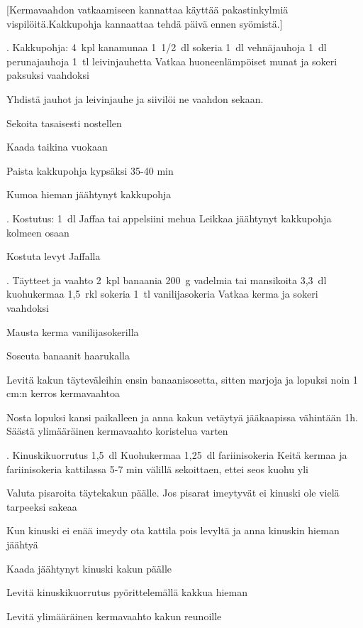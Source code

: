 [Kermavaahdon vatkaamiseen kannattaa käyttää pakastinkylmiä vispilöitä.Kakkupohja kannaattaa tehdä päivä ennen syömistä.]

\begin{step}
  . Kakkupohja:
  4~kpl kanamunaa
  1~1/2~dl sokeria
  1~dl vehnäjauhoja
  1~dl perunajauhoja
  1~tl leivinjauhetta
  \method
  Vatkaa huoneenlämpöiset munat ja sokeri paksuksi vaahdoksi

  Yhdistä jauhot ja leivinjauhe ja siivilöi ne vaahdon sekaan.

  Sekoita tasaisesti nostellen

  Kaada taikina vuokaan

  Paista kakkupohja  kypsäksi 35-40 min

  Kumoa hieman jäähtynyt kakkupohja
\end{step}

\begin{step}
  . Kostutus:
  1~dl Jaffaa tai appelsiini mehua
\method
Leikkaa jäähtynyt kakkupohja kolmeen osaan

Kostuta levyt Jaffalla
\end{step}

\begin{step}
  . Täytteet ja vaahto
  2~kpl banaania
  200~g vadelmia tai mansikoita
  3,3~dl kuohukermaa
  1,5~rkl sokeria
  1~tl vanilijasokeria
  \method
  Vatkaa kerma ja sokeri vaahdoksi

  Mausta kerma vanilijasokerilla

  Soseuta banaanit haarukalla

  Levitä kakun täyteväleihin ensin banaanisosetta, sitten marjoja ja lopuksi noin 1 cm:n kerros kermavaahtoa

  Nosta lopuksi kansi paikalleen ja anna kakun vetäytyä jääkaapissa vähintään 1h. Säästä ylimääräinen kermavaahto koristelua varten
\end{step}

\begin{step}
  . Kinuskikuorrutus
  1,5~dl Kuohukermaa
  1,25~dl fariinisokeria
  \method
  Keitä kermaa ja fariinisokeria kattilassa 5-7 min välillä sekoittaen, ettei seos kuohu yli

  Valuta pisaroita täytekakun päälle. Jos pisarat imeytyvät ei kinuski ole vielä tarpeeksi sakeaa

  Kun kinuski ei enää imeydy ota kattila pois levyltä ja anna kinuskin hieman jäähtyä

  Kaada jäähtynyt kinuski kakun päälle

  Levitä kinuskikuorrutus pyörittelemällä kakkua hieman

  Levitä ylimääräinen kermavaahto kakun reunoille
\end{step}

